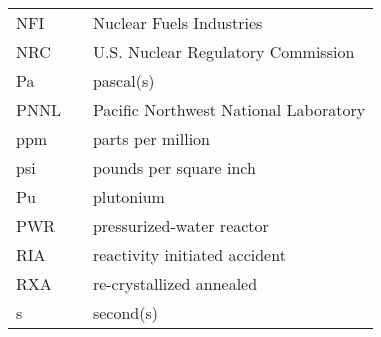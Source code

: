 \begin{ThreePartTable}
\begin{longtable}{l l l}
        NFI                         &      \hspace{0.25in}     &         Nuclear Fuels Industries                           \\ 
        
        NRC                         &      \hspace{0.25in}     &         U.S. Nuclear Regulatory Commission                 \\ 
        
        Pa                          &      \hspace{0.25in}     &         pascal(s)                                          \\ 
        
        PNNL                        &      \hspace{0.25in}     &         Pacific Northwest National Laboratory              \\ 
        
        ppm                         &      \hspace{0.25in}     &         parts per million                                  \\ 
        
        psi                         &      \hspace{0.25in}     &         pounds per square inch                             \\ 
        
        Pu                          &      \hspace{0.25in}     &         plutonium                                          \\ 
        
        PWR                         &      \hspace{0.25in}     &         pressurized-water reactor                          \\ 
        
        RIA                         &      \hspace{0.25in}     &         reactivity initiated accident                      \\ 
        
        RXA                         &      \hspace{0.25in}     &         re-crystallized annealed                           \\ 
        
        s                           &      \hspace{0.25in}     &         second(s)                                          \\ 
        

\end{longtable}
\end{ThreePartTable}
